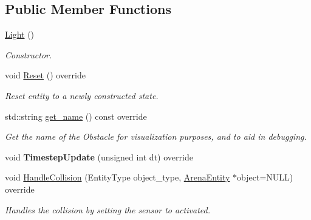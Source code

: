 \subsection*{Public Member Functions}
\begin{DoxyCompactItemize}
\item 
\mbox{\label{class_light_aeb5df09a25a32f19fdffa761268ba24f}} 
\mbox{\hyperlink{class_light_aeb5df09a25a32f19fdffa761268ba24f}{Light}} ()
\begin{DoxyCompactList}\small\item\em Constructor. \end{DoxyCompactList}\item 
\mbox{\label{class_light_a61485eb0684868b503e1b96e6a3206c3}} 
void \mbox{\hyperlink{class_light_a61485eb0684868b503e1b96e6a3206c3}{Reset}} () override
\begin{DoxyCompactList}\small\item\em Reset entity to a newly constructed state. \end{DoxyCompactList}\item 
\mbox{\label{class_light_a49b2e32cf8173353ac4689fdadbb95d5}} 
std\+::string \mbox{\hyperlink{class_light_a49b2e32cf8173353ac4689fdadbb95d5}{get\+\_\+name}} () const override
\begin{DoxyCompactList}\small\item\em Get the name of the Obstacle for visualization purposes, and to aid in debugging. \end{DoxyCompactList}\item 
\mbox{\label{class_light_a97934eec7489f9b072534f5e30a2d90d}} 
void {\bfseries Timestep\+Update} (unsigned int dt) override
\item 
\mbox{\label{class_light_ad8f77c9857b26273d913a18be1311a11}} 
void \mbox{\hyperlink{class_light_ad8f77c9857b26273d913a18be1311a11}{Handle\+Collision}} (Entity\+Type object\+\_\+type, \mbox{\hyperlink{class_arena_entity}{Arena\+Entity}} $\ast$object=N\+U\+LL) override
\begin{DoxyCompactList}\small\item\em Handles the collision by setting the sensor to activated. \end{DoxyCompactList}\item 

\end{DoxyCompactItemize}
